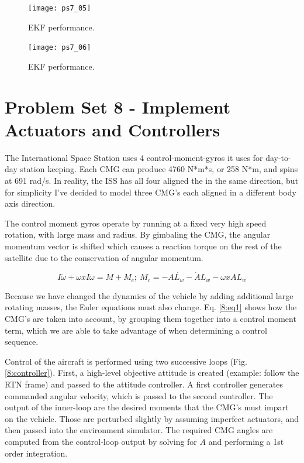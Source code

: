 \documentclass[12pt, letterpaper]{article}
\begin{document}
\begin{figure}[H]
	\centering
	\texttt{[image: ps7\_05]}
	\caption{EKF performance.}
	\label{7:ekf}
\end{figure}


\begin{figure}[H]
	\centering
	\texttt{[image: ps7\_06]}
	\caption{EKF performance.}
	\label{7:ekf}
\end{figure}



\section{Problem Set 8 - Implement Actuators and Controllers}

The International Space Station uses 4 control-moment-gyros it uses for day-to-day station keeping. Each CMG can produce 4760 N*m*s, or 258 N*m, and spins at 691 rad/s. In reality, the ISS has all four aligned the in the same direction, but for simplicity I've decided to model three CMG's each aligned in a different body axis direction.

The control moment gyros operate by running at a fixed very high speed rotation, with large mass and radius. By gimbaling the CMG, the angular momentum vector is shifted which causes a reaction torque on the rest of the satellite due to the conservation of angular momentum.


\begin{equation}
I\dot{\omega} + \omega x I\omega = M + M_c;\ M_c = -A\dot{L_w}-\dot{A}L_w-\omega x AL_w
\label{8:eq1}
\end{equation}

Because we have changed the dynamics of the vehicle by adding additional large rotating masses, the Euler equations must also change. Eq. \ref{8:eq1} shows how the CMG's are taken into account, by grouping them together into a control moment term, which we are able to take advantage of when determining a control sequence. 

Control of the aircraft is performed using two successive loops (Fig. \ref{8:controller}). First, a high-level objective attitude is created (example: follow the RTN frame) and passed to the attitude controller. A first controller generates commanded angular velocity, which is passed to the second controller. The output of the inner-loop are the desired moments that the CMG's must impart on the vehicle. Those are perturbed slightly by assuming imperfect actuators, and then passed into the environment simulator. The required CMG angles are computed from the control-loop output by solving for $\dot{A}$ and performing a 1st order integration.
\end{document}
